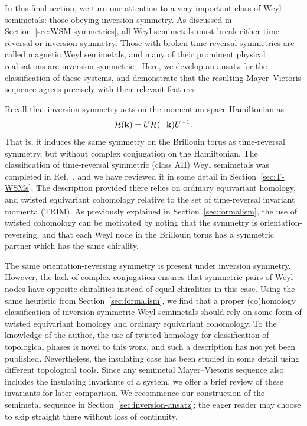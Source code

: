 In this final section, we turn our attention to a very important class of Weyl semimetals: those obeying inversion symmetry. As discussed in Section~\ref{sec:WSM-symmetries}, all Weyl semimetals must break either time-reversal or inversion symmetry. Those with broken time-reversal symmetries are called magnetic Weyl semimetals, and many of their prominent physical realisations are inversion-symmetric \cite{Liu_magnetic-WSM,Belopolski_magnetic-WSM,Morali_magnetic-WSM}. Here, we develop an ansatz for the classification of these systems, and demonstrate that the resulting Mayer--Vietoris sequence agrees precisely with their relevant features.

Recall that inversion symmetry acts on the momentum space Hamiltonian as
\begin{equation*}
	\mathcal{H}(\vb{k}) = U\mathcal{H}(-\vb{k})U^{-1}.
\end{equation*}
That is, it induces the same symmetry on the Brillouin torus as time-reversal symmetry, but without complex conjugation on the Hamiltonian. The classification of time-reversal symmetric (class AII) Weyl semimetals was completed in Ref.~\cite{Thiang_equivariant}, and we have reviewed it in some detail in Section~\ref{sec:T-WSMs}. The description provided there relies on ordinary equivariant homology, and twisted equivariant cohomology relative to the set of time-reversal invariant momenta (TRIM). As previously explained in Section~\ref{sec:formalism}, the use of twisted cohomology can be motivated by noting that the symmetry is orientation-reversing, and that each Weyl node in the Brillouin torus has a symmetric partner which has the same chirality.

The same orientation-reversing symmetry is present under inversion symmetry. However, the lack of complex conjugation ensures that symmetric pairs of Weyl nodes have opposite chiralities instead of equal chiralities in this case. Using the same heuristic from Section~\ref{sec:formalism}, we find that a proper (co)homology classification of inversion-symmetric Weyl semimetals should rely on some form of twisted equivariant homology and ordinary equivariant cohomology. To the knowledge of the author, the use of twisted homology for classification of topological phases is novel to this work, and such a description has not yet been published. Nevertheless, the insulating case has been studied in some detail using different topological tools. Since any semimetal Mayer--Vietoris sequence also includes the insulating invariants of a system, we offer a brief review of these invariants for later comparison. We recommence our construction of the semimetal sequence in Section~\ref{sec:inversion-ansatz}; the eager reader may choose to skip straight there without loss of continuity.


